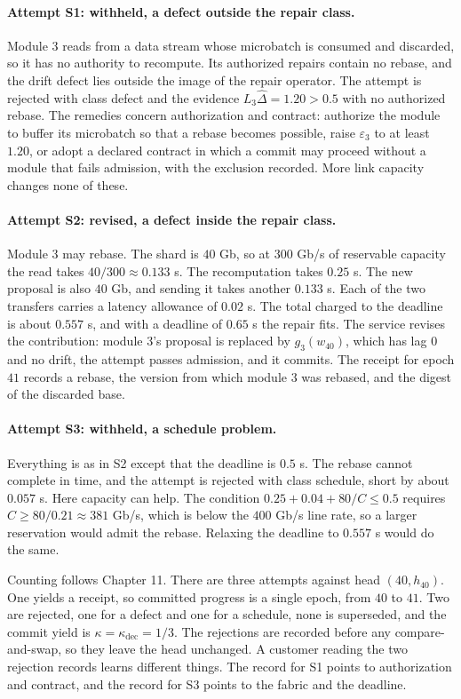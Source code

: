 \documentclass[11pt,openany]{book}
\theoremstyle{remark}
\begin{document}
\paragraph{Attempt S1: withheld, a defect outside the repair class.} Module 3 reads from a data stream whose microbatch is consumed and discarded, so it has no authority to recompute. Its authorized repairs contain no rebase, and the drift defect lies outside the image of the repair operator. The attempt is rejected with class defect and the evidence $L_3\hat\Delta=1.20>0.5$ with no authorized rebase. The remedies concern authorization and contract: authorize the module to buffer its microbatch so that a rebase becomes possible, raise $\varepsilon_3$ to at least $1.20$, or adopt a declared contract in which a commit may proceed without a module that fails admission, with the exclusion recorded. More link capacity changes none of these.

\paragraph{Attempt S2: revised, a defect inside the repair class.} Module 3 may rebase. The shard is $40$ Gb, so at $300$ Gb/s of reservable capacity the read takes $40/300\approx0.133$ s. The recomputation takes $0.25$ s. The new proposal is also $40$ Gb, and sending it takes another $0.133$ s. Each of the two transfers carries a latency allowance of $0.02$ s. The total charged to the deadline is about $0.557$ s, and with a deadline of $0.65$ s the repair fits. The service revises the contribution: module 3's proposal is replaced by $g_3(w_{40})$, which has lag $0$ and no drift, the attempt passes admission, and it commits. The receipt for epoch $41$ records a rebase, the version from which module 3 was rebased, and the digest of the discarded base.

\paragraph{Attempt S3: withheld, a schedule problem.} Everything is as in S2 except that the deadline is $0.5$ s. The rebase cannot complete in time, and the attempt is rejected with class schedule, short by about $0.057$ s. Here capacity can help. The condition $0.25+0.04+80/C\le0.5$ requires $C\ge80/0.21\approx381$ Gb/s, which is below the $400$ Gb/s line rate, so a larger reservation would admit the rebase. Relaxing the deadline to $0.557$ s would do the same.

Counting follows Chapter 11. There are three attempts against head $(40,h_{40})$. One yields a receipt, so committed progress is a single epoch, from $40$ to $41$. Two are rejected, one for a defect and one for a schedule, none is superseded, and the commit yield is $\kappa=\kappa_{\mathrm{dec}}=1/3$. The rejections are recorded before any compare-and-swap, so they leave the head unchanged. A customer reading the two rejection records learns different things. The record for S1 points to authorization and contract, and the record for S3 points to the fabric and the deadline.
\end{document}
